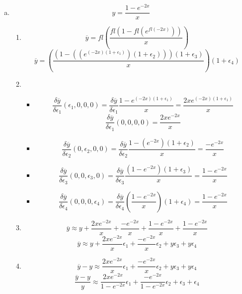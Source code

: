 \documentclass[12pt,a4paper]{article}
\begin{document}
\begin{enumerate}[(a)]
\item
\[
y= \frac{1-e^{-2x}}{x}
\]
\begin{enumerate}[1.]
\item
\[
\overline{y} = fl\left(\frac{fl\left(1-fl(e^{fl(-2x)})\right)}{x}\right)
\]
\[
\overline{y} = \left(\frac{\left(1-((e^{(-2x)(1+\epsilon_1)})(1+\epsilon_2))\right)(1+\epsilon_3)}{x}\right)(1+\epsilon_4)
\]
\item
\begin{itemize}
\item
\[
\frac{\delta\overline{y}}{\delta\epsilon_1}(\epsilon_1,0,0,0)
= \frac{\delta\overline{y}}{\delta\epsilon_1}
\frac{1-e^{(-2x)(1+\epsilon_1)}}{x}
= \frac{2xe^{(-2x)(1+\epsilon_1)}}{x}
\]
\[
\frac{\delta\overline{y}}{\delta\epsilon_1}(0,0,0,0)
= \frac{2xe^{-2x}}{x}
\]
\item
\[
\frac{\delta\overline{y}}{\delta\epsilon_2}(0,\epsilon_2,0,0)
= \frac{\delta\overline{y}}{\delta\epsilon_2}
\frac{1-(e^{-2x})(1+\epsilon_2)}{x}
= \frac{-e^{-2x}}{x}
\]
\item
\[
\frac{\delta\overline{y}}{\delta\epsilon_3}(0,0,\epsilon_3,0)
= \frac{\delta\overline{y}}{\delta\epsilon_3}
\frac{(1-e^{-2x})(1+\epsilon_3)}{x}
= \frac{1-e^{-2x}}{x}
\]

\item
\[
\frac{\delta\overline{y}}{\delta\epsilon_4}(0,0,0,\epsilon_4)
= \frac{\delta\overline{y}}{\delta\epsilon_4}
\left(\frac{1-e^{-2x}}{x}\right)(1+\epsilon_4)
= \frac{1-e^{-2x}}{x}
\]
\end{itemize}
\item
\[
\overline{y} \approx y +
\frac{2xe^{-2x}}{x}
+
\frac{-e^{-2x}}{x}
+
\frac{1-e^{-2x}}{x}
+
\frac{1-e^{-2x}}{x}
\]
\[
\overline{y} \approx y +
\frac{2xe^{-2x}}{x} \epsilon_1
+
\frac{-e^{-2x}}{x} \epsilon_2
+
y \epsilon_3
+
y \epsilon_4
\]
\item
\[
\overline{y} - y \approx 
\frac{2xe^{-2x}}{x} \epsilon_1
+
\frac{-e^{-2x}}{x} \epsilon_2
+
y \epsilon_3
+
y \epsilon_4
\]
\[
\frac{\overline{y}-y}{y} \approx 
\frac{2xe^{-2x}}{1-e^{-2x}}\epsilon_1
+
\frac{-e^{-2x}}{1-e^{-2x}}\epsilon_2
+
\epsilon_3
+
\epsilon_4
\]
\end{enumerate}


\end{enumerate}
\end{document}
